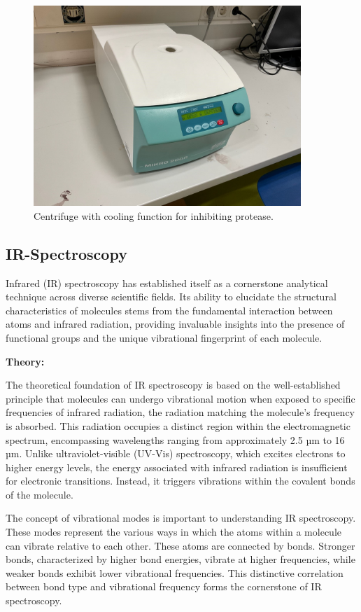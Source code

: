\begin{figure}[H]
    \centering
    \includegraphics[width=0.9\textwidth]{./media/images/centrifuge_cooling}
    \caption{Centrifuge with cooling function for inhibiting protease.}
    \label{fig:centrifuge_cooling}
\end{figure}


\subsection{IR-Spectroscopy}
Infrared (IR) spectroscopy has established itself as a cornerstone analytical technique across diverse scientific fields.
Its ability to elucidate the structural characteristics of molecules stems from the fundamental interaction between atoms and infrared radiation, providing invaluable insights into the presence of functional groups and the unique vibrational fingerprint of each molecule.

\textbf{Theory:}

The theoretical foundation of IR spectroscopy is based on the well-established principle that molecules can undergo vibrational motion when exposed to specific frequencies of infrared radiation, the radiation matching the molecule's frequency is absorbed.
This radiation occupies a distinct region within the electromagnetic spectrum, encompassing wavelengths ranging from approximately 2.5 µm to 16 µm.
Unlike ultraviolet-visible (UV-Vis) spectroscopy, which excites electrons to higher energy levels, the energy associated with infrared radiation is insufficient for electronic transitions.
Instead, it triggers vibrations within the covalent bonds of the molecule.

The concept of vibrational modes is important to understanding IR spectroscopy.
These modes represent the various ways in which the atoms within a molecule can vibrate relative to each other.
These atoms are connected by bonds.
Stronger bonds, characterized by higher bond energies, vibrate at higher frequencies, while weaker bonds exhibit lower vibrational frequencies.
This distinctive correlation between bond type and vibrational frequency forms the cornerstone of IR spectroscopy.


